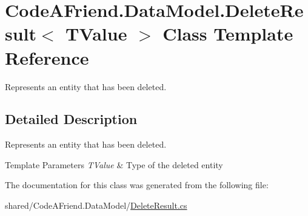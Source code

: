 \hypertarget{class_code_a_friend_1_1_data_model_1_1_delete_result}{}\section{Code\+A\+Friend.\+Data\+Model.\+Delete\+Result$<$ T\+Value $>$ Class Template Reference}
\label{class_code_a_friend_1_1_data_model_1_1_delete_result}


Represents an entity that has been deleted.  




\subsection{Detailed Description}
Represents an entity that has been deleted. 


\begin{DoxyTemplParams}{Template Parameters}
{\em T\+Value} & Type of the deleted entity\\
\hline
\end{DoxyTemplParams}


The documentation for this class was generated from the following file\+:\begin{DoxyCompactItemize}
\item 
shared/\+Code\+A\+Friend.\+Data\+Model/\mbox{\hyperlink{_delete_result_8cs}{Delete\+Result.\+cs}}\end{DoxyCompactItemize}
